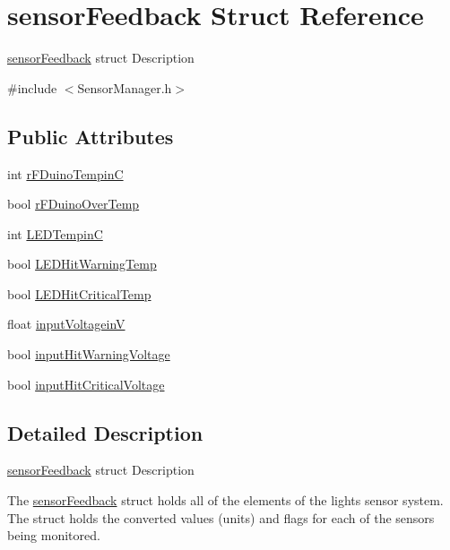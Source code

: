 \hypertarget{structsensorFeedback}{}\section{sensor\+Feedback Struct Reference}
\label{structsensorFeedback}


\hyperlink{structsensorFeedback}{sensor\+Feedback} struct Description  




{\ttfamily \#include $<$Sensor\+Manager.\+h$>$}

\subsection*{Public Attributes}
\begin{DoxyCompactItemize}
\item 
int \hyperlink{structsensorFeedback_a53390cf1282c32f034856a70247a1023}{r\+F\+Duino\+TempinC}
\item 
bool \hyperlink{structsensorFeedback_ad5fc6b5a188a008b8cb38977bc22f94a}{r\+F\+Duino\+Over\+Temp}
\item 
int \hyperlink{structsensorFeedback_aec838e691afdbba8b383b58ed6bc1d66}{L\+E\+D\+TempinC}
\item 
bool \hyperlink{structsensorFeedback_a26fb822365209c813ad80ee3652f9c97}{L\+E\+D\+Hit\+Warning\+Temp}
\item 
bool \hyperlink{structsensorFeedback_adb0ca1ac228b4a62b45c76e384dde09d}{L\+E\+D\+Hit\+Critical\+Temp}
\item 
float \hyperlink{structsensorFeedback_a6d15be3de3b4cd6cd4c6241e7e82eaee}{input\+VoltageinV}
\item 
bool \hyperlink{structsensorFeedback_a79d2c6dd33bd9ed6f2130fc8d6dd043b}{input\+Hit\+Warning\+Voltage}
\item 
bool \hyperlink{structsensorFeedback_abec79152b143b3a372419703d3375976}{input\+Hit\+Critical\+Voltage}
\end{DoxyCompactItemize}


\subsection{Detailed Description}
\hyperlink{structsensorFeedback}{sensor\+Feedback} struct Description 

The \hyperlink{structsensorFeedback}{sensor\+Feedback} struct holds all of the elements of the light\textquotesingle{}s sensor system. The struct holds the converted values (units) and flags for each of the sensors being monitored. 

